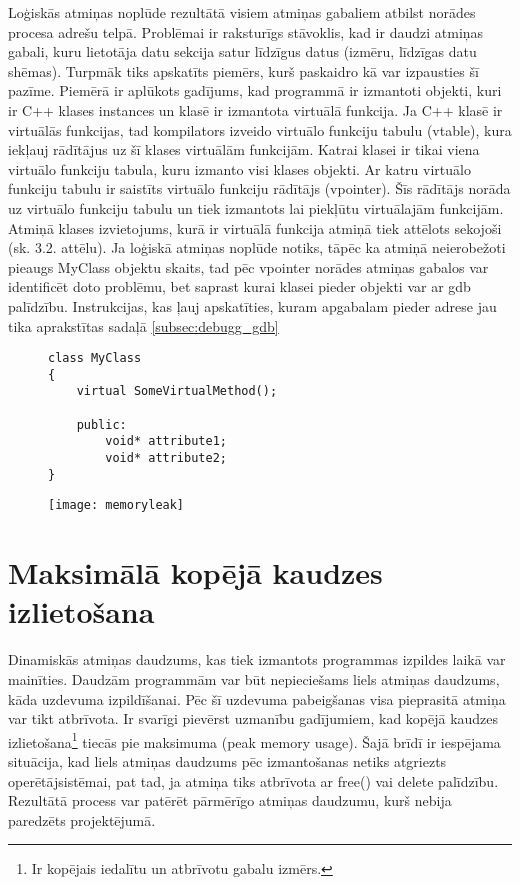 Loģiskās atmiņas noplūde rezultātā visiem atmiņas gabaliem atbilst norādes procesa adrešu telpā. 
Problēmai ir raksturīgs stāvoklis, kad ir daudzi atmiņas gabali, kuru lietotāja datu sekcija satur līdzīgus datus (izmēru, līdzīgas datu shēmas).
Turpmāk tiks apskatīts piemērs, kurš paskaidro kā var izpausties šī pazīme.
Piemērā ir aplūkots gadījums, kad programmā ir izmantoti objekti, kuri ir  C++ klases instances un klasē ir izmantota virtuālā funkcija.
Ja C++ klasē ir virtuālās funkcijas, tad kompilators izveido virtuālo funkciju tabulu (vtable), kura iekļauj rādītājus uz šī klases virtuālām funkcijām.
 Katrai klasei ir tikai viena virtuālo funkciju tabula, kuru izmanto visi klases objekti.
 Ar katru virtuālo funkciju tabulu ir saistīts virtuālo funkciju rādītājs (vpointer).
 Šīs rādītājs norāda uz virtuālo funkciju tabulu un tiek izmantots lai piekļūtu virtuālajām funkcijām.
Atmiņā klases izvietojums, kurā ir virtuālā funkcija atmiņā tiek attēlots sekojoši (sk. 3.2. attēlu).
Ja loģiskā atmiņas noplūde notiks, tāpēc ka atmiņā neierobežoti pieaugs MyClass objektu skaits, tad pēc vpointer norādes atmiņas gabalos var identificēt doto problēmu, bet saprast kurai klasei pieder objekti var ar gdb palīdzību.
Instrukcijas, kas ļauj apskatīties, kuram apgabalam pieder adrese jau tika aprakstītas sadaļā \ref{subsec:debugg_gdb}
\begin{figure}[h]
\begin{lstlisting}
class MyClass
{
    virtual SomeVirtualMethod();
    
    public:
        void* attribute1;
        void* attribute2;
}
\end{lstlisting}
\end{figure}
\begin{figure}[h]
\begin{center}
\texttt{[image: memoryleak]}
\end{center}
\caption{\textbf{\fontsize{11}{12}\selectfont {C++ klases ar virtuālo funkciju izvietojums atmiņā }}}
\label{fig:memoryleak}
\end{figure}



\section{Maksimālā kopējā kaudzes izlietošana}
 \label{sec:peak_mem}
Dinamiskās atmiņas daudzums, kas tiek izmantots programmas izpildes laikā var mainīties.
Daudzām programmām var būt nepieciešams liels atmiņas daudzums, kāda uzdevuma izpildīšanai.
Pēc šī uzdevuma pabeigšanas visa pieprasitā atmiņa var tikt atbrīvota.
Ir svarīgi pievērst uzmanību gadījumiem, kad kopējā kaudzes izlietošana\footnote{Ir kopējais iedalītu un atbrīvotu gabalu izmērs.} tiecās pie maksimuma (peak memory usage).
Šajā brīdī ir iespējama situācija, kad liels atmiņas daudzums pēc izmantošanas netiks atgriezts operētājsistēmai, pat tad, ja atmiņa tiks atbrīvota ar free() vai delete palīdzību.
Rezultātā process var patērēt pārmērīgo atmiņas daudzumu, kurš nebija paredzēts projektējumā.

